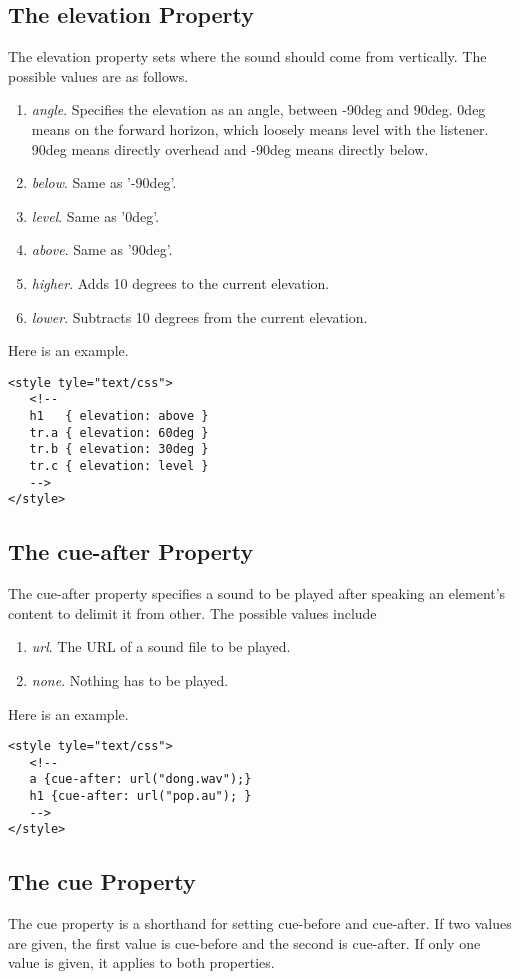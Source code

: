 \documentclass[a4paper,oneside]{book}
\numberwithin{equation}{chapter}
\begin{document}
\subsection{The elevation Property}
The elevation property sets where the sound should come from vertically. The possible values are as follows.
\begin{enumerate}
\item \textit{angle}. Specifies the elevation as an angle, between -90deg and 90deg. 0deg means on the forward horizon, which loosely means level with the listener. 90deg means directly overhead and -90deg means directly below.
\item \textit{below}. Same as '-90deg'.
\item \textit{level}. Same as '0deg'.
\item \textit{above}. Same as '90deg'.
\item \textit{higher}. Adds 10 degrees to the current elevation.
\item \textit{lower}. Subtracts 10 degrees from the current elevation.
\end{enumerate}
Here is an example.
\begin{verbatim}
<style tyle="text/css">
   <!--
   h1   { elevation: above }
   tr.a { elevation: 60deg }
   tr.b { elevation: 30deg }
   tr.c { elevation: level }
   -->
</style>
\end{verbatim}
\subsection{The cue-after Property}
The cue-after property specifies a sound to be played after speaking an element's content to delimit it from other. The possible values include 
\begin{enumerate}
\item \textit{url}. The URL of a sound file to be played.
\item \textit{none}. Nothing has to be played.
\end{enumerate}
Here is an example.
\begin{verbatim}
<style tyle="text/css">
   <!--
   a {cue-after: url("dong.wav");}
   h1 {cue-after: url("pop.au"); }
   -->
</style>
\end{verbatim}
\subsection{The cue Property}
The cue property is a shorthand for setting cue-before and cue-after. If two values are given, the first value is cue-before and the second is cue-after. If only one value is given, it applies to both properties.
\end{document}
